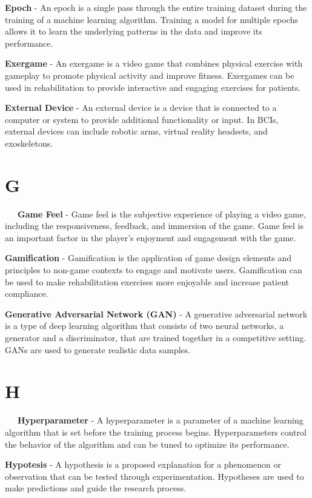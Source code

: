 \textbf{Epoch} - An epoch is a single pass through the entire training dataset during the training of a machine learning algorithm. Training a model for multiple epochs allows it to learn the underlying patterns in the data and improve its performance.

\textbf{Exergame} - An exergame is a video game that combines physical exercise with gameplay to promote physical activity and improve fitness. Exergames can be used in rehabilitation to provide interactive and engaging exercises for patients.

\textbf{External Device} - An external device is a device that is connected to a computer or system to provide additional functionality or input. In BCIs, external devices can include robotic arms, virtual reality headsets, and exoskeletons.

\section*{G}

\-\ \-\ \-\ \textbf{Game Feel} - Game feel is the subjective experience of playing a video game, including the responsiveness, feedback, and immersion of the game. Game feel is an important factor in the player's enjoyment and engagement with the game.

\textbf{Gamification} - Gamification is the application of game design elements and principles to non-game contexts to engage and motivate users. Gamification can be used to make rehabilitation exercises more enjoyable and increase patient compliance.

\textbf{Generative Adversarial Network (GAN)} - A generative adversarial network is a type of deep learning algorithm that consists of two neural networks, a generator and a discriminator, that are trained together in a competitive setting. GANs are used to generate realistic data samples.

\section*{H}

\-\ \-\ \-\ \textbf{Hyperparameter} - A hyperparameter is a parameter of a machine learning algorithm that is set before the training process begins. Hyperparameters control the behavior of the algorithm and can be tuned to optimize its performance.

\textbf{Hypotesis} - A hypothesis is a proposed explanation for a phenomenon or observation that can be tested through experimentation. Hypotheses are used to make predictions and guide the research process.

